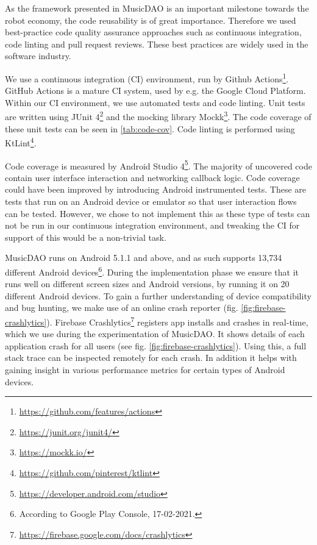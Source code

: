 As the framework presented in MusicDAO is an important milestone towards the robot economy, the code reusability is of great importance. Therefore we used best-practice code quality assurance approaches such as continuous integration, code linting and pull request reviews. These best practices are widely used in the software industry.

We use a continuous integration (CI) environment, run by Github Actions\footnote{\url{https://github.com/features/actions}}. GitHub Actions is a mature CI system, used by e.g. the Google Cloud Platform. Within our CI environment, we use automated tests and code linting. Unit tests are written using JUnit 4\footnote{\url{https://junit.org/junit4/}} and the mocking library Mockk\footnote{\url{https://mockk.io/}}. The code coverage of these unit tests can be seen in \ref{tab:code-cov}. Code linting is performed using KtLint\footnote{\url{https://github.com/pinterest/ktlint}}.

Code coverage is measured by Android Studio 4\footnote{\url{https://developer.android.com/studio}}. The majority of uncovered code contain user interface interaction and networking callback logic. Code coverage could have been improved by introducing Android instrumented tests. These are tests that run on an Android device or emulator so that user interaction flows can be tested. However, we chose to not implement this as these type of tests can not be run in our continuous integration environment, and tweaking the CI for support of this would be a non-trivial task.

MusicDAO runs on Android 5.1.1 and above, and as such supports 13,734 different Android devices\footnote{According to Google Play Console, 17-02-2021.}. During the implementation phase we ensure that it runs well on different screen sizes and Android versions, by running it on 20 different Android devices. To gain a further understanding of device compatibility and bug hunting, we make use of an online crash reporter (fig. \ref{fig:firebase-crashlytics}). Firebase Crashlytics\footnote{\url{https://firebase.google.com/docs/crashlytics}} registers app installs and crashes in real-time, which we use during the experimentation of MusicDAO. It shows details of each application crash for all users (see fig. \ref{fig:firebase-crashlytics}). Using this, a full stack trace can be inspected remotely for each crash. In addition it helps with gaining insight in various performance metrics for certain types of Android devices.

